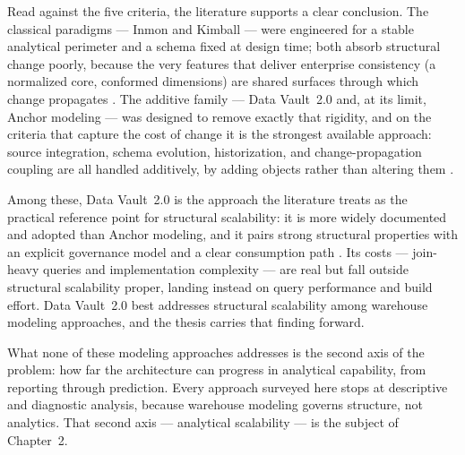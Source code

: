 Read against the five criteria, the literature supports a clear conclusion. The classical paradigms --- Inmon and Kimball --- were engineered for a stable analytical perimeter and a schema fixed at design time; both absorb structural change poorly, because the very features that deliver enterprise consistency (a normalized core, conformed dimensions) are shared surfaces through which change propagates \parencite{inmon2005, kimball2013, golfarelli2009}. The additive family --- Data Vault~2.0 and, at its limit, Anchor modeling --- was designed to remove exactly that rigidity, and on the criteria that capture the cost of change it is the strongest available approach: source integration, schema evolution, historization, and change-propagation coupling are all handled additively, by adding objects rather than altering them \parencite{linstedt2015, ronnback2010anchor}.

Among these, Data Vault~2.0 is the approach the literature treats as the practical reference point for structural scalability: it is more widely documented and adopted than Anchor modeling, and it pairs strong structural properties with an explicit governance model and a clear consumption path \parencite{linstedt2015, giebler2019dv}. Its costs --- join-heavy queries and implementation complexity --- are real but fall outside structural scalability proper, landing instead on query performance and build effort. Data Vault~2.0 best addresses structural scalability among warehouse modeling approaches, and the thesis carries that finding forward.

What none of these modeling approaches addresses is the second axis of the problem: how far the architecture can progress in analytical capability, from reporting through prediction. Every approach surveyed here stops at descriptive and diagnostic analysis, because warehouse modeling governs structure, not analytics. That second axis --- analytical scalability --- is the subject of Chapter~2.
